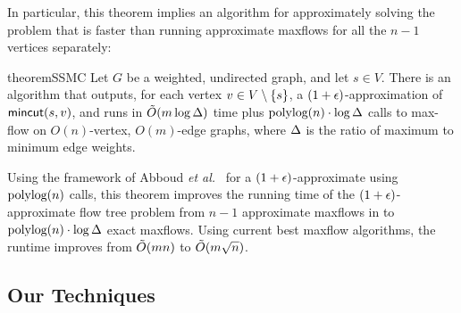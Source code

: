 In particular, this theorem implies an algorithm for approximately solving the \ssc problem that is faster than running approximate maxflows for all the $n-1$ vertices separately:

\begin{restatable}{theorem}{SSMC}
Let $G$ be a weighted, undirected graph, and let $s\in V$. There is an algorithm that outputs, for each vertex $v\in V\setminus\{s\}$, a $(1+\epsilon)$-approximation of $\textsf{\textup{mincut}}(s,v)$, and runs in $\tilde{O}(m\log\Delta)$ time plus $\textup{polylog}(n)\cdot \log\Delta$ calls to max-flow on $O(n)$-vertex, $O(m)$-edge graphs, where $\Delta$ is the ratio of maximum to minimum edge weights.
\end{restatable}

Using the framework of Abboud {\em et al.}~\cite{AbboudKT20b} for a $(1+\epsilon)$-approximate \apc using $\textup{polylog}(n)$ \ssc calls, this theorem improves the running time of the $(1+\epsilon)$-approximate flow tree problem from $n-1$ approximate maxflows in \cite{AbboudKT20b} to $\textup{polylog}(n)\cdot \log \Delta$ exact maxflows. Using current best maxflow algorithms, the runtime improves from $\tilde{O}(mn)$ to $\tilde{O}(m\sqrt{n})$.

\subsection{Our Techniques}

